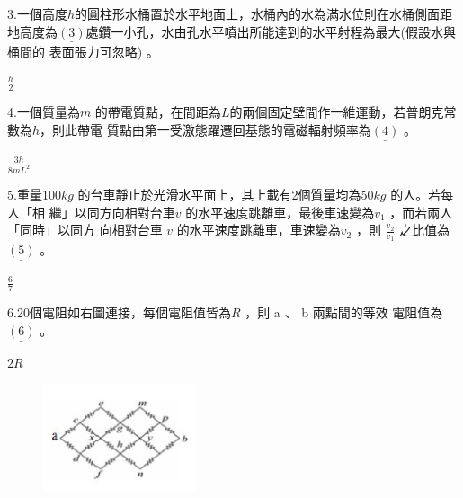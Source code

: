 \documentclass[cn,10pt,math=newtx]{elegantbook}
\begin{document}
\begin{example}
   3.一個高度$h$的圓柱形水桶置於水平地面上，水桶內的水為滿水位則在水桶側面距地高度為$\underline{(3)}$處鑽一小孔，水由孔水平噴出所能達到的水平射程為最大(假設水與桶間的
表面張力可忽略) 。\\
    \rightline{[文華高中教甄109]}
\end{example}
\begin{solution}
    $\frac{h} {2}$
\end{solution}

\newpage


\begin{example}
   4.一個質量為$m$ 的帶電質點，在間距為$ L$的兩個固定壁間作一維運動，若普朗克常數為$h$，則此帶電 質點由第一受激態躍遷回基態的電磁輻射頻率為$\underline{(4)}$ 。\\
    \rightline{[文華高中教甄109]}
\end{example}
\begin{solution}
    $\frac{3h} {8mL^2}$
\end{solution}

\newpage


\begin{example}
   5.重量100$ kg$ 的台車靜止於光滑水平面上，其上載有2個質量均為50$kg$ 的人。若每人「相
繼」以同方向相對台車$ v$ 的水平速度跳離車，最後車速變為$v _1$ ，而若兩人「同時」以同方
向相對台車 $v$ 的水平速度跳離車，車速變為$v_2$ ，則 $\frac{v_2}{v_1}$ 之比值為$\underline{(5)}$ 。\\
    \rightline{[文華高中教甄109]}
\end{example}
\begin{solution}
    $\frac{6}{7}$
\end{solution}

\newpage

\begin{example}
   6.20個電阻如右圖連接，每個電阻值皆為$ R$ ，則 a 、 b 兩點間的等效
電阻值為$\underline{(6)} $ 。
\\
    \rightline{[文華高中教甄109]}
\end{example}
\begin{solution}
    $2R$
\end{solution}
\begin{figure}[htbp]
    \flushright
    \includegraphics[width=0.4\textwidth]{image/109文華6.png}
  \end{figure}
\newpage
\end{document}
